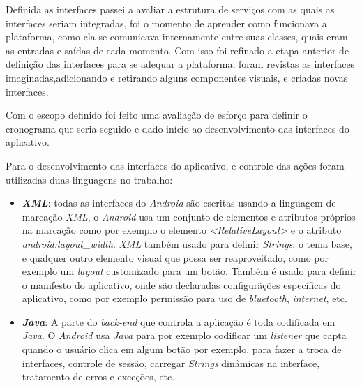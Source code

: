 \documentclass[hidelinks,12pt]{article}
\begin{document}
Definida as interfaces passei a avaliar a estrutura de servi\c{c}os com as quais as interfaces seriam integradas, foi o momento de aprender como funcionava a plataforma, como ela se comunicava internamente entre suas classes, quais eram as entradas e sa\'idas de cada momento. Com isso foi refinado a etapa anterior de defini\c{c}\~ao das interfaces para se adequar a plataforma, foram revistas as interfaces imaginadas,adicionando e retirando alguns componentes visuais, e criadas novas interfaces.

Com o escopo definido foi feito uma avalia\c{c}\~ao de esfor\c{c}o para definir o cronograma que seria seguido e dado in\'icio ao desenvolvimento das interfaces do aplicativo.

Para o desenvolvimento das interfaces do aplicativo, e controle das a\c{c}\~oes foram utilizadas duas linguagens no trabalho:
\begin{itemize}
	\item \textbf{\textit{XML}}: todas as interfaces do \textit{Android} s\~ao escritas usando a linguagem de marca\c{c}\~ao \textit{XML}, o \textit{Android} usa um conjunto de elementos e atributos pr\'oprios na marca\c{c}\~ao como por exemplo o elemento \textit{\textless{RelativeLayout}\textgreater} e o atributo \textit{android:layout\_width}. \textit{XML} tamb\'em usado para definir \textit{Strings}, o tema base, e qualquer outro elemento visual que possa ser reaproveitado, como por exemplo um \textit{layout} customizado para um bot\~ao. Tamb\'em \'e usado para definir o manifesto do aplicativo, onde s\~ao declaradas configur\~a\c{c}\~oes espec\'ificas do aplicativo, como por exemplo permiss\~ao para uso de \textit{bluetooth}, \textit{internet}, etc.
	\item \textbf{\textit{Java}}: A parte do \textit{back-end} que controla a aplica\c{c}\~ao \'e toda codificada em \textit{Java}. O \textit{Android} usa \textit{Java} para por exemplo codificar um \textit{listener} que capta quando o usu\'ario clica em algum bot\~ao por exemplo, para fazer a troca de interfaces, controle de sess\~ao, carregar \textit{Strings} dinâmicas na interface, tratamento de erros e exce\c{c}\~oes, etc.
\end{itemize}
\end{document}
